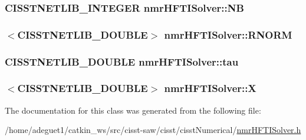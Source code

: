 \hypertarget{classnmr_h_f_t_i_solver_ab83977ce7dee82d78187122861d5492e}{
\subsubsection[{N\-B}]{\setlength{\rightskip}{0pt plus 5cm}C\-I\-S\-S\-T\-N\-E\-T\-L\-I\-B\-\_\-\-I\-N\-T\-E\-G\-E\-R nmr\-H\-F\-T\-I\-Solver\-::\-N\-B\hspace{0.3cm}{\ttfamily [protected]}}}\label{classnmr_h_f_t_i_solver_ab83977ce7dee82d78187122861d5492e}
\hypertarget{classnmr_h_f_t_i_solver_a48c6c27d605fc52aca0b91a2f077e555}{
\subsubsection[{R\-N\-O\-R\-M}]{$<$C\-I\-S\-S\-T\-N\-E\-T\-L\-I\-B\-\_\-\-D\-O\-U\-B\-L\-E$>$ nmr\-H\-F\-T\-I\-Solver\-::\-R\-N\-O\-R\-M\hspace{0.3cm}{\ttfamily [protected]}}}\label{classnmr_h_f_t_i_solver_a48c6c27d605fc52aca0b91a2f077e555}
\hypertarget{classnmr_h_f_t_i_solver_ae2a7e0bc2500e3f05e2028b37b7666bc}{
\subsubsection[{tau}]{\setlength{\rightskip}{0pt plus 5cm}C\-I\-S\-S\-T\-N\-E\-T\-L\-I\-B\-\_\-\-D\-O\-U\-B\-L\-E nmr\-H\-F\-T\-I\-Solver\-::tau\hspace{0.3cm}{\ttfamily [protected]}}}\label{classnmr_h_f_t_i_solver_ae2a7e0bc2500e3f05e2028b37b7666bc}
\hypertarget{classnmr_h_f_t_i_solver_a4e62d4f46bf8c16e79aef9063ce9a901}{
\subsubsection[{X}]{$<$C\-I\-S\-S\-T\-N\-E\-T\-L\-I\-B\-\_\-\-D\-O\-U\-B\-L\-E$>$ nmr\-H\-F\-T\-I\-Solver\-::\-X\hspace{0.3cm}{\ttfamily [protected]}}}\label{classnmr_h_f_t_i_solver_a4e62d4f46bf8c16e79aef9063ce9a901}


The documentation for this class was generated from the following file\-:\begin{DoxyCompactItemize}
\item 
/home/adeguet1/catkin\-\_\-ws/src/cisst-\/saw/cisst/cisst\-Numerical/\hyperlink{nmr_h_f_t_i_solver_8h}{nmr\-H\-F\-T\-I\-Solver.\-h}\end{DoxyCompactItemize}
